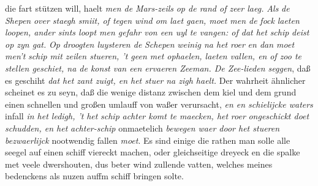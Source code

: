 \pend 
\pstart {} die fart st\"{u}tzen will, haelt \textit{men de }\textit{Mars-zeils}\protect{}\textit{ op de rand of zeer laeg. }
\pend 
\pstart \textit{ Als }\textit{ de }\textit{Shepen}\protect{}\textit{ over staegh smiit, of tegen wind om laet gaen, moet men de }\textit{fock}\protect{}\textit{ laeten loopen, ander sints loopt men gefahr von een uyl te vangen: of dat het }\textit{schip}\protect{}\textit{ deist op zyn gat.}
\pend 
\pstart \textit{ Op droogten luysteren de }\textit{Schepen}\protect{}\textit{ weinig na het }\textit{roer}\protect{}\textit{ en dan moet men't }\textit{schip}\protect{}\textit{ mit zeilen stueren, 't geen met ophaelen, laeten vallen, en }\textit{ of zoo te stellen geschiet, na de konst van een ervaeren Zeeman. De Zee-lieden seggen}, daß es geschiht \textit{dat het zant zuigt, en het stuer}\protect{}\textit{ na zigh haelt.} Der wahrheit \"{a}hnlicher scheinet es zu seyn, daß die wenige distanz zwischen dem kiel\protect{} und dem grund einen schnellen und großen umlauff von waßer verursacht, \textit{en en schielijcke waters} infall \textit{in het ledigh, 't } \textit{het }\textit{schip}\protect{}\textit{ achter komt te maecken, het }\textit{roer}\protect{}\textit{ ongeschickt doet schudden, en het }\textit{achter-schip}\protect{} onmaetelich \textit{bewegen waer door het stueren bezwaerlijck} nootwendig fallen \textit{moet}. Es sind einige die rathen man solle alle seegel\protect{} auf einen schiff\protect{} viereckt machen, oder gleichseitige dreyeck en die spalke met veele dwershouten, dus beter wind zullende vatten, welches meines bedenckens  als nuzen auffm schiff\protect{} bringen solte.